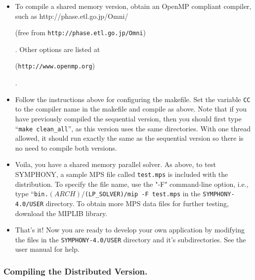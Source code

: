 \begin{itemize}
        \item To compile a shared memory version, obtain an OpenMP
        compliant compiler, such as 
        {http://phase.etl.go.jp/Omni/}
\begin{latexonly} 
        (free from {\tt http://phase.etl.go.jp/Omni})
\end{latexonly}. 
        Other options are listed at 
\begin{latexonly}
        ({\tt http://www.openmp.org})
\end{latexonly}.

        \item Follow the instructions above for configuring the makefile. Set
the variable {\tt CC} to the compiler name in the makefile and compile as
above. Note that if you have previously compiled the sequential version, then
you should first type ``{\tt make clean\_all}'', as this version uses the same
directories.  With one thread allowed, it should run exactly the same as the
sequential version so there is no need to compile both versions.

        \item Voila, you have a shared memory parallel solver. As above, to
test SYMPHONY, a sample MPS file called \texttt{test.mps} is included with the
distribution. To specify the file name, use the "-F" command-line option,
i.e., type ``\texttt{bin.$(ARCH)/$(LP\_SOLVER)/mip -F test.mps} in the
\texttt{SYMPHONY-4.0/USER} directory. To obtain more MPS data files for further
testing, download the MIPLIB library.

\item That's it! Now you are ready to develop your own application by modifying
the files in the \texttt{SYMPHONY-4.0/USER} directory and it's
subdirectories. See the user manual for help.

\end{itemize}

\subsubsection{Compiling the Distributed Version.}

